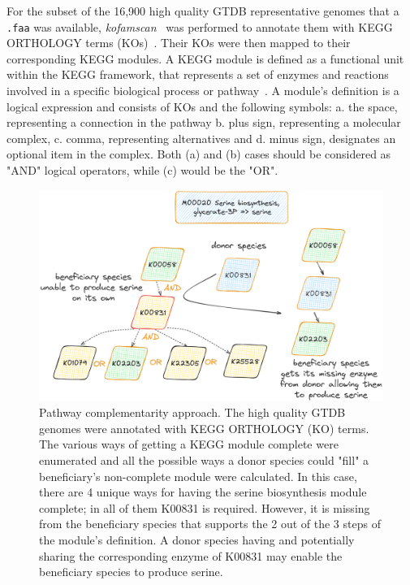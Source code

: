 \documentclass[sn-mathphys,Numbered, lineno]{sn-jnl}  %
\theoremstyle{thmstyleone}%
\theoremstyle{thmstyletwo}%
\theoremstyle{thmstylethree}%
\begin{document}
        For the subset of the 16,900 high quality GTDB representative genomes that a \texttt{.faa} was available, 
        \textit{kofamscan}~\cite{aramaki2020kofamkoala} was performed to annotate them with KEGG ORTHOLOGY terms (KOs)~\cite{kanehisa2012kegg}. 
        Their KOs were then mapped to their corresponding KEGG modules. 
        A KEGG module is defined as a functional unit within the KEGG framework, that represents a set of enzymes and reactions involved in a specific biological process or pathway~\cite{muto2013modular}.
        A module's definition is a logical expression and consists of KOs and the following symbols:
        a. the space, representing a connection in the pathway
        b. plus sign, representing a molecular complex,  
        c. comma, representing alternatives and
        d. minus sign, designates an optional item in the complex.
        Both (a) and (b) cases should be considered as "AND" logical operators, while (c) would be the "OR".

        \begin{figure}[h!]
        \label{fig:path-compl}
        \includegraphics*[width=0.8\columnwidth]{figs/path_complem.png}
        \caption{
            Pathway complementarity approach. 
            The high quality GTDB genomes were annotated with KEGG ORTHOLOGY (KO) terms.
            The various ways of getting a KEGG module complete were enumerated and all the possible ways a donor species could "fill" a beneficiary's non-complete module were calculated.
            In this case, there are 4 unique ways for having the serine biosynthesis module complete; in all of them K00831 is required.
            However, it is missing from the beneficiary species that supports the 2 out of the 3 steps of the module's definition.
            A donor species having and potentially sharing the corresponding enzyme of K00831 may enable the beneficiary species to produce serine.
        }
        \end{figure}
\end{document}
